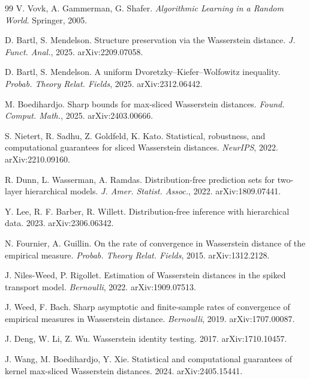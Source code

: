 \begin{thebibliography}{99}
 V. Vovk, A. Gammerman, G. Shafer.
\emph{Algorithmic Learning in a Random World}. Springer, 2005.

 D. Bartl, S. Mendelson. Structure preservation via the
Wasserstein distance. \emph{J. Funct. Anal.}, 2025. arXiv:2209.07058.

 D. Bartl, S. Mendelson. A uniform
Dvoretzky--Kiefer--Wolfowitz inequality. \emph{Probab. Theory Relat. Fields}, 2025.
arXiv:2312.06442.

 M. Boedihardjo. Sharp bounds for max-sliced Wasserstein
distances. \emph{Found. Comput. Math.}, 2025. arXiv:2403.00666.

 S. Nietert, R. Sadhu, Z. Goldfeld, K. Kato. Statistical,
robustness, and computational guarantees for sliced Wasserstein distances.
\emph{NeurIPS}, 2022. arXiv:2210.09160.

 R. Dunn, L. Wasserman, A. Ramdas. Distribution-free
prediction sets for two-layer hierarchical models. \emph{J. Amer. Statist. Assoc.},
2022. arXiv:1809.07441.

 Y. Lee, R. F. Barber, R. Willett. Distribution-free
inference with hierarchical data. 2023. arXiv:2306.06342.

 N. Fournier, A. Guillin. On the rate of convergence in
Wasserstein distance of the empirical measure. \emph{Probab. Theory Relat. Fields},
2015. arXiv:1312.2128.

 J. Niles-Weed, P. Rigollet. Estimation of Wasserstein
distances in the spiked transport model. \emph{Bernoulli}, 2022. arXiv:1909.07513.

 J. Weed, F. Bach. Sharp asymptotic and finite-sample rates of
convergence of empirical measures in Wasserstein distance. \emph{Bernoulli}, 2019.
arXiv:1707.00087.

 J. Deng, W. Li, Z. Wu. Wasserstein identity testing.
2017. arXiv:1710.10457.

 J. Wang, M. Boedihardjo, Y. Xie. Statistical and
computational guarantees of kernel max-sliced Wasserstein distances. 2024.
arXiv:2405.15441.

\end{thebibliography}

